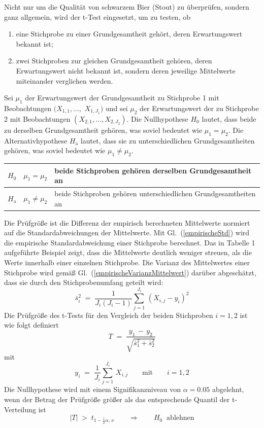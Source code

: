 Nicht nur um die Qualität von schwarzem Bier (Stout) zu überprüfen, sondern ganz
allgemein, wird der t-Test eingesetzt, um zu testen, ob 
\begin{enumerate}
\item eine Stichprobe zu einer Grundgesamtheit gehört,
 deren Erwartungswert bekannt ist;
\item zwei Stichproben zur gleichen Grundgesamtheit gehören,
 deren Erwartungswert nicht bekannt ist, sondern deren jeweilige
 Mittelwerte miteinander verglichen werden.
\end{enumerate}

Sei $\mu_1$ der Erwartungswert der Grundgesamtheit zu Stichprobe 1 mit
Beobachtungen $(X_{1,1},\dots,$ $X_{1,J_1})$ und sei $\mu_2$ der Erwartungswert der 
zu Stichprobe 2 mit Beobachtungen $(X_{2,1}, \dots, X_{2,J_2})$.
Die Nullhypothese $H_0$ lautet, dass beide zu derselben Grundgesamtheit gehören,
was soviel bedeutet wie $\mu_1 = \mu_2$. Die Alternativhypothese $H_\mathrm{a}$
lautet, dass sie zu unterschiedlichen Grundgesamtheiten gehören,
was soviel bedeutet wie $\mu_1 \neq \mu_2$.

\begin{center}
\begin{tabular}{c|cl}
$H_0$ & $\mu_1 = \mu_2$ & beide Stichproben gehören derselben Grundgesamtheit an\\
\hline
$H_\mathrm{a}$ & $\mu_1 \neq \mu_2$ & beide Stichproben gehören unterschiedlichen Grundgesamtheiten an
\end{tabular}
\end{center}

Die Prüfgröße ist die Differenz der empirisch berechneten Mittelwerte normiert auf die
Standardabweichungen der Mittelwerte. Mit Gl.~(\ref{empirischeStd}) wird die
empirische Standardabweichung einer Stichprobe berechnet. Das in Tabelle 1 aufgeführte
Beispiel zeigt, dass die Mittelwerte deutlich weniger streuen, als die Werte innerhalb
einer einzelnen Stichprobe. Die Varianz des Mittelwertes einer Stichprobe wird gemäß
Gl.~(\ref{empirischeVarianzMittelwert}) darüber abgeschätzt, dass sie durch den Stichprobenumfang geteilt wird:
\begin{equation}
\bar s_i^2 \; = \; \frac{1}{J_i (J_i - 1)} \sum_{j=1}^{J_i} \, (X_{i,j} - y_i)^2
\end{equation}
Die Prüfgröße des t-Tests für den Vergleich der beiden Stichproben $i = 1,2$ ist wie folgt definiert
\begin{equation}
T \; = \; \frac{y_1 \, - \, y_2}{\sqrt{\bar s_1^2 + \bar s_2^2}}
\label{tTest}
\end{equation}
mit
\begin{equation}
y_i \; = \; \frac{1}{J_i}\sum_{j=1}^{J_i} \, X_{i,j} \qquad \mathrm{mit} \qquad
i = 1, 2
\end{equation}
Die Nullhypothese wird mit einem Signifikanzniveau von $\alpha = 0.05$ abgelehnt, wenn
der Betrag der Prüfgröße größer als das entsprechende Quantil der t-Verteilung ist
\begin{equation}
|T| \; > \; t_{1-\frac{1}{2} \alpha, \, \nu} \qquad \Rightarrow \qquad H_0 \; \; \mathrm{ablehnen}
\end{equation}



